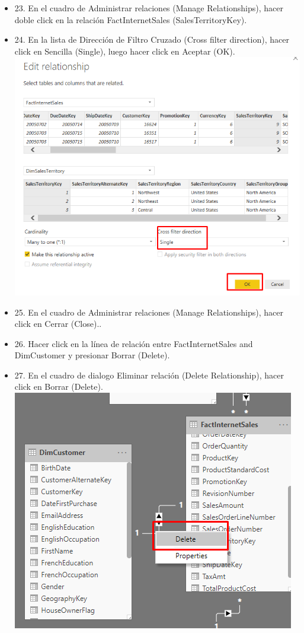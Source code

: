 \begin{itemize}
\item 23. En el cuadro de Administrar relaciones (Manage Relationships), hacer doble click en la relación FactInternetSales (SalesTerritoryKey).
\item 24. En la lista de Dirección de Filtro Cruzado (Cross filter direction), hacer click en Sencilla (Single), luego hacer click en Aceptar (OK). \\
\includegraphics[scale=0.5]{./Imagenes/image008}
\item 25. En el cuadro de Administrar relaciones (Manage Relationships), hacer click en Cerrar (Close)..
\item 26. Hacer click en la línea de relación entre FactInternetSales and DimCustomer y presionar Borrar (Delete).
\item 27. En el cuadro de dialogo Eliminar relación (Delete Relationship), hacer click en Borrar (Delete).\\
\includegraphics[scale=0.5]{./Imagenes/image009}

\end{itemize}
